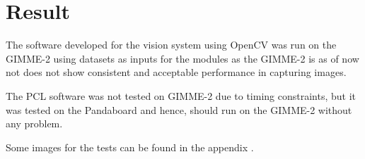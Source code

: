 \section{Result}\label{sec:result}
The software developed for the vision system using OpenCV was run on the GIMME-2 using datasets as inputs for the modules as the GIMME-2 is as of now not does not show consistent and acceptable performance in capturing images. 

The PCL software was not tested on GIMME-2 due to timing constraints, but it was tested on the Pandaboard and hence, should run on the GIMME-2 without any problem.

Some images for the tests can be found in the appendix \label{vision_appendix_A} .